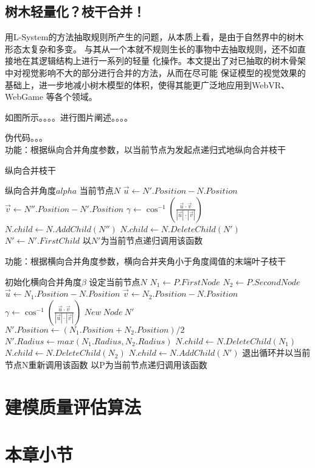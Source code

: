 \subsection{树木轻量化？枝干合并！}
\label{subsec:branchmerge}
用L-System的方法抽取规则所产生的问题，从本质上看，是由于自然界中的树木形态太复杂和多变。
与其从一个本就不规则生长的事物中去抽取规则，还不如直接地在其逻辑结构上进行一系列的轻量
化操作。本文提出了对已抽取的树木骨架中对视觉影响不大的部分进行合并的方法，从而在尽可能
保证模型的视觉效果的基础上，进一步地减小树木模型的体积，使得其能更广泛地应用到WebVR、WebGame
等各个领域。

如图所示。。。。进行图片阐述。。。。

伪代码。。。\\
功能：根据纵向合并角度参数，以当前节点为发起点递归式地纵向合并枝干\\
\begin{algorithm}
	\caption{纵向合并枝干}
	\begin{algorithmic}[1]
		\Require 纵向合并角度$alpha$
		\Require 当前节点$N$
		\State $\vec{u} \gets N'.Position-N.Position$
		\State $\vec{v} \gets N''.Position-N'.Position$
		\State $\gamma \gets \cos^{-1}({\frac{\vec{u} \cdot \vec{v}}{|\vec{u}|\cdot|\vec{v}|}})$
		\If{$\gamma<\alpha$}
		\State $N.child \gets N.AddChild(N'')$
		\State $N.child \gets N.DeleteChild(N') $
		\EndIf
		\State $N' \gets N'.FirstChild$
		\EndWhile
		\EndFor
		\State 以$N'$为当前节点递归调用该函数
		\EndFor
		\EndIf
	\end{algorithmic}
\end{algorithm}

功能：根据横向合并角度参数，横向合并夹角小于角度阈值的末端叶子枝干\\
\begin{algorithmic}[1]
	\State 初始化横向合并角度$\beta$
	\State 设定当前节点$N$
		\State $N_1 \gets P.FirstNode$
		\State $N_2 \gets P.SecondNode$
			\State $\vec{u} \gets N_1.Position - N.Position$
			\State $\vec{v} \gets N_2.Position - N.Position$
			\State $\gamma \gets \cos^{-1}({\frac{\vec{u} \cdot \vec{v}}{|\vec{u}|\cdot|\vec{v}|}})$
			\If{$\gamma<\beta$}
				\State $New\ Node\ N'$
				\State $N'.Position \gets (N_1.Position+N_2.Position)/2$
				\State $N'.Radius \gets max(N_1.Radius,N_2.Radius)$
				\State $N.child \gets N.DeleteChild(N_1)$
				\State $N.child \gets N.DeleteChild(N_2)$
				\State $N.child \gets N.AddChild(N')$
				\State 退出循环并以当前节点N重新调用该函数
			\EndIf
		\EndIf
	\EndFor
		\State 以P为当前节点递归调用该函数
	\EndFor
\end{algorithmic}


\section{建模质量评估算法}
\label{sec:qualityevaluation}

\section{本章小节}
\label{sec:conclusion}
